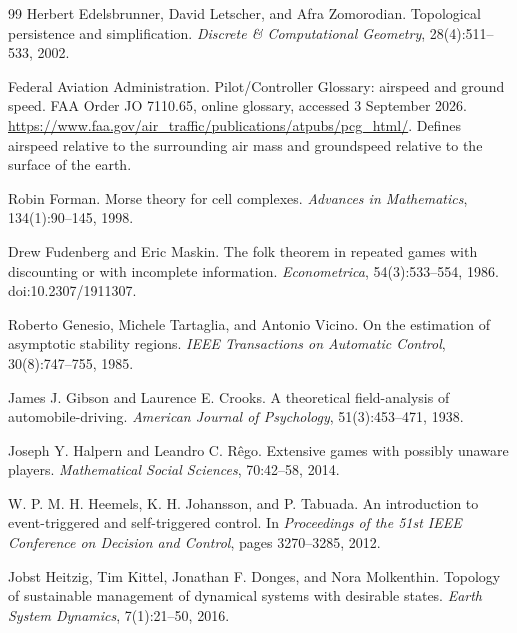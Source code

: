 \documentclass[11pt,a4paper]{article}
\theoremstyle{remark}
\begin{document}
\begin{thebibliography}{99}
Herbert Edelsbrunner, David Letscher, and Afra Zomorodian.
\newblock Topological persistence and simplification.
\newblock \emph{Discrete \& Computational Geometry}, 28(4):511--533, 2002.

Federal Aviation Administration.
\newblock Pilot/Controller Glossary: airspeed and ground speed.
\newblock FAA Order JO 7110.65, online glossary, accessed 3 September 2026.
\newblock \url{https://www.faa.gov/air_traffic/publications/atpubs/pcg_html/}.
\newblock Defines airspeed relative to the surrounding air mass and groundspeed relative to the
surface of the earth.

Robin Forman.
\newblock Morse theory for cell complexes.
\newblock \emph{Advances in Mathematics}, 134(1):90--145, 1998.

Drew Fudenberg and Eric Maskin.
\newblock The folk theorem in repeated games with discounting or with incomplete information.
\newblock \emph{Econometrica}, 54(3):533--554, 1986.
\newblock doi:10.2307/1911307.

Roberto Genesio, Michele Tartaglia, and Antonio Vicino.
\newblock On the estimation of asymptotic stability regions.
\newblock \emph{IEEE Transactions on Automatic Control}, 30(8):747--755, 1985.

James J. Gibson and Laurence E. Crooks.
\newblock A theoretical field-analysis of automobile-driving.
\newblock \emph{American Journal of Psychology}, 51(3):453--471, 1938.

Joseph Y. Halpern and Leandro C. R\^ego.
\newblock Extensive games with possibly unaware players.
\newblock \emph{Mathematical Social Sciences}, 70:42--58, 2014.

W. P. M. H. Heemels, K. H. Johansson, and P. Tabuada.
\newblock An introduction to event-triggered and self-triggered control.
\newblock In \emph{Proceedings of the 51st IEEE Conference on Decision and Control}, pages 3270--3285, 2012.

Jobst Heitzig, Tim Kittel, Jonathan F. Donges, and Nora Molkenthin.
\newblock Topology of sustainable management of dynamical systems with desirable states.
\newblock \emph{Earth System Dynamics}, 7(1):21--50, 2016.


\end{thebibliography}
\end{document}
